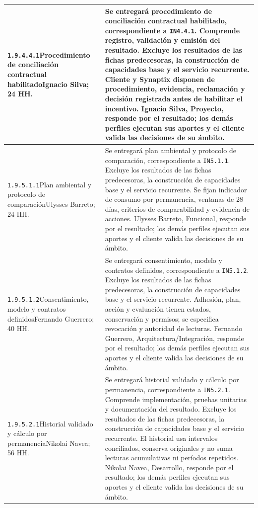 \begin{longtable}{L{52mm}L{91mm}}
\texttt{1.\allowbreak{}9.\allowbreak{}4.\allowbreak{}4.\allowbreak{}1}\newline Procedimiento de conciliación contractual habilitado\newline Ignacio Silva; 24 HH. & Se entregará procedimiento de conciliación contractual habilitado, correspondiente a \texttt{IN4.4.1}. Comprende registro, validación y emisión del resultado. Excluye los resultados de las fichas predecesoras, la construcción de capacidades base y el servicio recurrente.  Cliente y Synaptix disponen de procedimiento, evidencia, reclamación y decisión registrada antes de habilitar el incentivo. Ignacio Silva, Proyecto, responde por el resultado; los demás perfiles ejecutan sus aportes y el cliente valida las decisiones de su ámbito.\\\hline
\texttt{1.\allowbreak{}9.\allowbreak{}5.\allowbreak{}1.\allowbreak{}1}\newline Plan ambiental y protocolo de comparación\newline Ulysses Barreto; 24 HH. & Se entregará plan ambiental y protocolo de comparación, correspondiente a \texttt{IN5.1.1}. Excluye los resultados de las fichas predecesoras, la construcción de capacidades base y el servicio recurrente.  Se fijan indicador de consumo por permanencia, ventanas de 28 días, criterios de comparabilidad y evidencia de acciones. Ulysses Barreto, Funcional, responde por el resultado; los demás perfiles ejecutan sus aportes y el cliente valida las decisiones de su ámbito.\\\hline
\texttt{1.\allowbreak{}9.\allowbreak{}5.\allowbreak{}1.\allowbreak{}2}\newline Consentimiento, modelo y contratos definidos\newline Fernando Guerrero; 40 HH. & Se entregará consentimiento, modelo y contratos definidos, correspondiente a \texttt{IN5.1.2}. Excluye los resultados de las fichas predecesoras, la construcción de capacidades base y el servicio recurrente.  Adhesión, plan, acción y evaluación tienen estados, conservación y permisos; se especifica revocación y autoridad de lecturas. Fernando Guerrero, Arquitectura/Integración, responde por el resultado; los demás perfiles ejecutan sus aportes y el cliente valida las decisiones de su ámbito.\\\hline
\texttt{1.\allowbreak{}9.\allowbreak{}5.\allowbreak{}2.\allowbreak{}1}\newline Historial validado y cálculo por permanencia\newline Nikolai Navea; 56 HH. & Se entregará historial validado y cálculo por permanencia, correspondiente a \texttt{IN5.2.1}. Comprende implementación, pruebas unitarias y documentación del resultado. Excluye los resultados de las fichas predecesoras, la construcción de capacidades base y el servicio recurrente.  El historial usa intervalos conciliados, conserva originales y no suma lecturas acumulativas ni períodos repetidos. Nikolai Navea, Desarrollo, responde por el resultado; los demás perfiles ejecutan sus aportes y el cliente valida las decisiones de su ámbito.\\\hline

\end{longtable}

